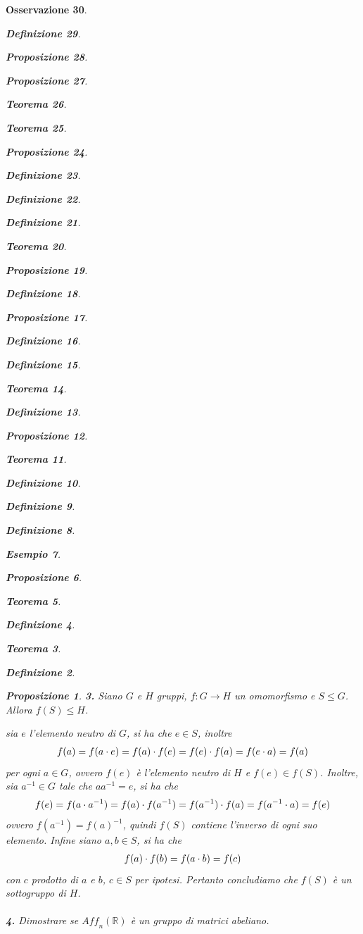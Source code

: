 \documentclass[oneside, 11pt]{amsbook}
\makeatletter
\newcommand{\0}{{(0)}}
\newcommand{\3}{{(3)}}
\theoremstyle{colonplain}
\newtheorem{thm}{Teorema}[chapter]
\newtheorem{prop}[thm]{Proposizione}
\theoremstyle{colondefinition}
\newtheorem{defn}[thm]{Definizione}
\newtheorem{ex}[thm]{Esempio}
\theoremstyle{colonremark}
\newtheorem{rmk}[thm]{Osservazione}
\numberwithin{equation}{chapter}
\renewcommand{\proofname}{Dimostrazione}
\renewenvironment{proof}[1][\proofname]{\par
  \pushQED{\end{proof}}%
  \normalfont \topsep6\p@\@plus6\p@\relax
  \trivlist
  \item[\hskip\labelsep\bfseries #1:]\ignorespaces
}{%
  \popQED\endtrivlist\@endpefalse
}
\makeatother
\begin{document}
\begin{rmk}
\begin{defn}
\begin{prop}
\begin{prop}
\begin{thm}
\begin{thm}
\begin{prop}
\begin{defn}
\begin{defn}
\begin{defn}
\begin{thm}
\begin{prop}
\begin{defn}
\begin{prop}
\begin{defn}
\begin{defn}
\begin{thm}
\begin{defn}
\begin{prop}
\begin{thm}
\begin{defn}
\begin{defn}
\begin{defn}
\begin{ex}
\begin{prop}
\begin{thm}
\begin{defn}
\begin{thm}
\begin{defn}
\begin{prop}
\begin{proof}
\begin{proof}
\textbf{3.} Siano $G$ e $H$ gruppi, $f : G \longrightarrow H$ un omomorfismo e $S \leq G$. Allora $f(S) \leq H$. \\

\begin{proof} sia $e$ l'elemento neutro di $G$, si ha che $e \in S$, inoltre
\begin{align}
    f(a) = f(a \cdot e) = f(a) \cdot f(e) = f(e) \cdot f(a) = f(e \cdot a) = f(a) \notag
\end{align}
per ogni $a \in G$, ovvero $f(e)$ è l'elemento neutro di $H$ e $f(e) \in f(S)$. Inoltre, sia $a^{-1} \in G$ tale che $aa^{-1} = e$, si ha che
\begin{align}
    f(e) = f(a \cdot a^{-1}) = f(a) \cdot f(a^{-1}) = f(a^{-1}) \cdot f(a) = f(a^{-1} \cdot a) = f(e) \notag
\end{align}
ovvero $f(a^{-1}) = f(a)^{-1}$, quindi $f(S)$ contiene l'inverso di ogni suo elemento. Infine siano $a, b \in S$, si ha che
\begin{align}
    f(a) \cdot f(b) = f(a \cdot b) = f(c) \notag
\end{align}
con $c$ prodotto di $a$ e $b$, $c \in S$ per ipotesi. Pertanto concludiamo che $f(S)$ è un sottogruppo di $H$. \\ \\
\textbf{4.} Dimostrare se $\textit{Aff}_n(\mathbb{R})$ è un gruppo di matrici abeliano. \\


\end{proof}
\end{proof}
\end{proof}
\end{prop}
\end{defn}
\end{thm}
\end{defn}
\end{thm}
\end{prop}
\end{ex}
\end{defn}
\end{defn}
\end{defn}
\end{thm}
\end{prop}
\end{defn}
\end{thm}
\end{defn}
\end{defn}
\end{prop}
\end{defn}
\end{prop}
\end{thm}
\end{defn}
\end{defn}
\end{defn}
\end{prop}
\end{thm}
\end{thm}
\end{prop}
\end{prop}
\end{defn}
\end{rmk}
\end{document}
